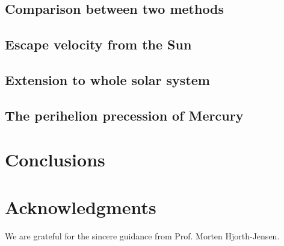 \documentclass{article}
\begin{document}
	\subsection{Comparison between two methods}
	

	\subsection{Escape velocity from the Sun}
	
	
	\subsection{Extension to whole solar system}
	
	
	\subsection{The perihelion precession of Mercury}
	
	
\section{Conclusions}\label{conclude}

	
	\section*{Acknowledgments}
	We are grateful for the sincere guidance from Prof. Morten Hjorth-Jensen. 
	
	\nocite{*} 
	
	
\end{document}
